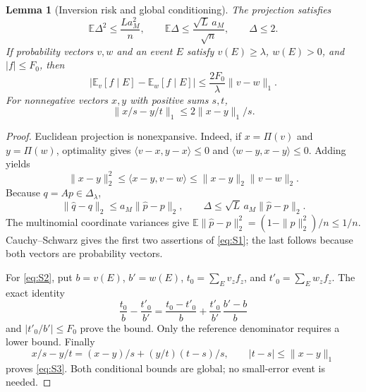 \documentclass[11pt,a4paper]{article}
\numberwithin{equation}{section}
\newtheorem{lemma}[theorem]{Lemma}
\theoremstyle{definition}
\newcommand{\E}{\mathbb E}
\begin{document}
\begin{lemma}[Inversion risk and global conditioning]\label{lem:statbasic}
The projection satisfies
\begin{equation}\label{eq:S1}
 \E\Delta^2\le\frac{La_M^2}{n},\qquad
 \E\Delta\le\frac{\sqrt L\,a_M}{\sqrt n},\qquad \Delta\le2 .
\end{equation}
If probability vectors \(v,w\) and an event \(E\) satisfy
\(v(E)\ge\lambda\), \(w(E)>0\), and \(|f|\le F_0\), then
\begin{equation}\label{eq:S2}
 |\E_v[f\mid E]-\E_w[f\mid E]|
          \le\frac{2F_0}{\lambda}\|v-w\|_1.
\end{equation}
For nonnegative vectors \(x,y\) with positive sums \(s,t\),
\begin{equation}\label{eq:S3}
 \|x/s-y/t\|_1\le 2\|x-y\|_1/s .
\end{equation}
\end{lemma}
\begin{proof}
Euclidean projection is nonexpansive. Indeed, if \(x=\Pi(v)\) and
\(y=\Pi(w)\), optimality gives
\(\langle v-x,y-x\rangle\le0\) and
\(\langle w-y,x-y\rangle\le0\). Adding yields
\[
 \|x-y\|_2^2\le\langle x-y,v-w\rangle
                    \le\|x-y\|_2\|v-w\|_2 .
\]
Because \(q=Ap\in\Delta_\lambda\),
\[
 \|\widehat q-q\|_2\le a_M\|\widehat p-p\|_2,\qquad
 \Delta\le\sqrt L\,a_M\|\widehat p-p\|_2 .
\]
The multinomial coordinate variances give
\(\E\|\widehat p-p\|_2^2=(1-\|p\|_2^2)/n\le1/n\).
Cauchy--Schwarz gives the first two assertions of \eqref{eq:S1};
the last follows because both vectors are probability vectors.

For \eqref{eq:S2}, put \(b=v(E)\), \(b'=w(E)\),
\(t_0=\sum_Ev_zf_z\), and \(t'_0=\sum_Ew_zf_z\).
The exact identity
\[
 \frac{t_0}{b}-\frac{t'_0}{b'}
   =\frac{t_0-t'_0}{b}
      +\frac{t'_0}{b'}\,\frac{b'-b}{b}
\]
and \(|t'_0/b'|\le F_0\) prove the bound.
Only the reference denominator requires a lower bound.
Finally
\[
 x/s-y/t=(x-y)/s+(y/t)(t-s)/s,\qquad
 |t-s|\le\|x-y\|_1
\]
proves \eqref{eq:S3}. Both conditional bounds are global; no
small-error event is needed.
\end{proof}
\end{document}
